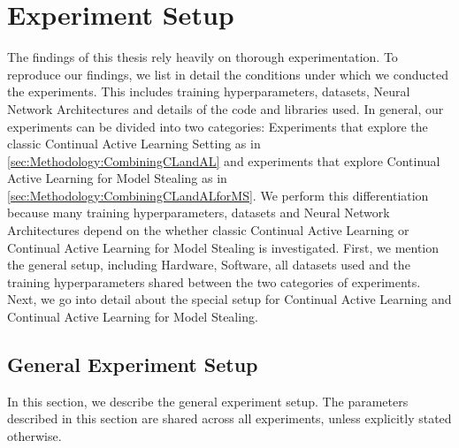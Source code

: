 
\chapter{Experiment Setup}
\label{ch:ExperimentSetup}
The findings of this thesis rely heavily on thorough experimentation. To reproduce our findings, we list in detail the
conditions under which we conducted the experiments. This includes training hyperparameters, datasets, Neural Network Architectures
and details of the code and libraries used. In general, our experiments can be divided into two categories: Experiments that explore
the classic Continual Active Learning Setting as in \ref{sec:Methodology:CombiningCLandAL} and experiments that explore Continual 
Active Learning for Model Stealing as in \ref{sec:Methodology:CombiningCLandALforMS}. We perform this differentiation because many 
training hyperparameters, datasets and Neural Network Architectures depend on the whether classic Continual Active Learning or Continual 
Active Learning for Model Stealing is investigated. First, we mention the general setup, including Hardware, Software, all datasets used
and the training hyperparameters shared between the two categories of experiments. Next, we go into detail about the special setup for
Continual Active Learning and Continual Active Learning for Model Stealing.

\section{General Experiment Setup}
\label{sec:ExperimentSetup:FirstSection}
In this section, we describe the general experiment setup. The parameters described in this section are shared across all experiments, unless
explicitly stated otherwise.

